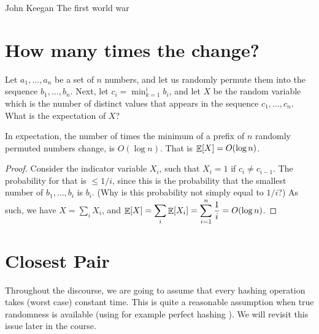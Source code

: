 %



\ChapterPrefix{}
\ChapterGen{}

%
{John Keegan}%
{The first world war}


\section{How many times the  change?}

Let $a_1, \ldots, a_n$ be a set of $n$ numbers, and let us randomly
permute them into the sequence $b_1,\ldots, b_n$. Next, let $c_i =
\min_{k=1}^{i} b_i$, and let $X$ be the random variable which is the
number of distinct values that appears in the sequence $c_1, \ldots,
c_n$. What is the expectation of $X$?

\begin{lemma}
    In expectation, the number of times the minimum of a prefix of $n$
    randomly permuted numbers change, is $O(\log n)$. That is
    $\mathop{\mathbb{E}}\!\left[ {X} \right] = O(\log n)$.
\end{lemma}
\begin{proof}
    Consider the indicator variable $X_i$, such that $X_i=1$ if
    $c_i \ne c_{i-1}$. The probability for that is $\leq 1/i$, since
    this is the probability that the smallest number of
    $b_1,\ldots, b_i$ is $b_i$.  (Why is this probability not simply
    equal to $1/i$?)  As such, we have $X = \sum_{i} X_i$, and
    $\displaystyle \mathop{\mathbb{E}}\!\left[ {X} \right] = \sum_i \mathop{\mathbb{E}}\!\left[ { X_i } \right] = \sum_{i=1}^n
    \frac{1}{i} = O( \log n)$.
\end{proof}


\section{Closest Pair}

\begin{assumption}
    Throughout the discourse, we are going to assume that every
    hashing operation takes (worst case) constant time. This is quite
    a reasonable assumption when true randomness is available (using
    for example perfect hashing \cite{clrs-ia-01}). We will revisit
    this issue later in the course.
\end{assumption}

